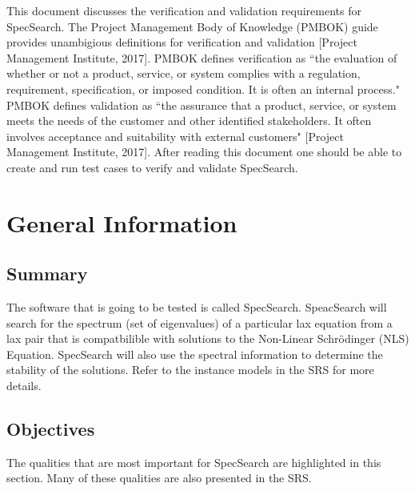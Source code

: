 \documentclass[12pt, titlepage]{article}
\begin{document}
\listoftables


\newpage


This document discusses the verification and validation requirements for 
SpecSearch. The Project Management Body of Knowledge (PMBOK) guide provides 
unambigious definitions for verification and validation [Project Management 
Institute, 2017].  PMBOK defines 
verification as ``the evaluation of whether or not a product, service, or 
system 
complies with a regulation, requirement, specification, or imposed condition. 
It is often an internal process." \\

PMBOK defines validation as ``the assurance that 
a product, service, or system meets the needs of the customer and other 
identified stakeholders. It often involves acceptance and suitability with 
external customers" [Project Management Institute, 2017]. After reading this 
document one should be able to create and run test cases to verify and validate 
SpecSearch. 

\section{General Information}

\subsection{Summary}
\label{Summary} 

The software that is going to be tested is called SpecSearch. SpeacSearch
 will 
search for the 
spectrum (set of eigenvalues) of a particular lax equation from a lax pair that 
is compatbilible 
with solutions to the Non-Linear Schr\"{o}dinger (NLS) Equation. SpecSearch 
will 
also use 
the spectral information to determine the stability of the solutions. Refer to 
the 
instance models in the SRS for more details.
\subsection{Objectives}
\label{Objectives}
	The qualities that are most important for SpecSearch are highlighted in 
	this section. Many of these qualities are also presented in the SRS. \\
	
\end{document}
